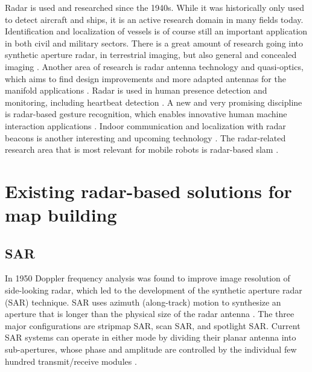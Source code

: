 Radar is used and researched since the 1940s. While it was historically only used to detect aircraft and ships, it is an active research domain in many fields today.
Identification and localization of vessels is of course still an important application in both civil and military sectors.
There is a great amount of research going into synthetic aperture radar, in terrestrial imaging, but also general and concealed imaging \cite{Cumming2004,Axelsson2002,Bury2007,Wang2008,Sarmap.ch2009,Moreira2013,Watts2016}.
Another area of research is radar antenna technology and quasi-optics, which aims to find design improvements and more adapted antennas for the manifold applications \cite{Lu2014,Tewari2015,Gorniak2008,Vinicchayakul2016,Bisognin2014,Ernst2016a,Nordin2016,Craeye2008}.
Radar is used in human presence detection and monitoring, including heartbeat detection \cite{Valmori2016,Novak2017,Zhong2016,Mabrouk2015,Ernst2016,Molchanov2011,Sakamoto2015,Molchanov2011a,Jian2014}.
A new and very promising discipline is radar-based gesture recognition, which enables innovative human machine interaction applications \cite{Lien2016,Kim2016,Molchanov2015}.
Indoor communication and localization with radar beacons is another interesting and upcoming technology \cite{Vinicchayakul2016,Albaidhani2016,Zhong2016,Zhu2016,Segura2012,Marano2010}.
The radar-related research area that is most relevant for mobile robots is radar-based slam \cite{Adams2012,Guan2017,Rapp2016,Rouveure2008,Ristic2016,Marck2013,Deissler2010,Kauffman2014,Guerra2016,Jose2004,Jose2004a,Jose2004b,Jose2005,Gerossier2009,Mullane2010,Deissler2013,Schuster2016,Adams2013,Deissler2012,Seitz2008,Deissler2010,Deissler2009}.

\section{Existing radar-based solutions for map building}\label{existing-radar-based-solutions-for-map-building}

\subsection{SAR}\label{sar}

In 1950 Doppler frequency analysis was found to improve image resolution
of side-looking radar, which led to the development of the synthetic
aperture radar (SAR) technique. SAR uses azimuth (along-track) motion to
synthesize an aperture that is longer than the physical size of the
radar antenna \cite{Wang2008}. The three major configurations are
stripmap SAR, scan SAR, and spotlight SAR. Current SAR systems can
operate in either mode by dividing their planar antenna into
sub-apertures, whose phase and amplitude are controlled by the
individual few hundred transmit/receive modules \cite{Moreira2013}.


